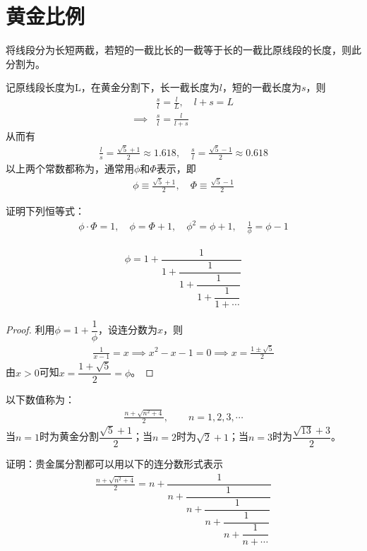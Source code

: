 
\section{黄金比例}
\label{sec:golden-ratio}

\begin{definition}
  将线段分为长短两截，若短的一截比长的一截等于长的一截比原线段的长度，则此分割为。
\end{definition}

记原线段长度为L，在黄金分割下，长一截长度为$l$，短的一截长度为$s$，则
\begin{align*}
  &\frac sl=\frac lL,\quad l+s=L\\
  \implies& \frac sl=\frac l{l+s}
\end{align*}
从而有
\begin{align*}
  \frac ls=\frac{\sqrt5+1}2\approx 1.618, \quad \frac sl=\frac{\sqrt5-1}2\approx 0.618
\end{align*}
以上两个常数都称为，通常用$\phi$和$\Phi$表示，即
\begin{align*}
  \phi\equiv\frac{\sqrt5+1}2,\quad \Phi\equiv\frac{\sqrt5-1}2
\end{align*}

\begin{question}
  证明下列恒等式：
  \begin{align*}
    \phi\cdot\Phi=1,\quad \phi=\Phi+1,\quad \phi^2=\phi+1,\quad \frac1\phi=\phi-1
  \end{align*}
\end{question}

\begin{example}[连分数表示]\label{ex:phi-of-continued-fraction}
  \begin{align}
    \phi = 1 + \dfrac1{1 + \dfrac1{1+\dfrac1{1+\dfrac1{1+\cdots}}}}
  \end{align}
\end{example}
\begin{proof}
  利用$\phi=1+\dfrac1\phi$，设连分数为$x$，则
  \begin{align*}
    \frac1{x-1}=x\implies x^2-x-1=0\implies x=\frac{1\pm\sqrt5}2
  \end{align*}
  由$x>0$可知$x=\dfrac{1+\sqrt5}2=\phi$。
\end{proof}

\begin{definition}
  以下数值称为：
  \begin{align}
    \frac{n+\sqrt{n^2+4}}2,\quad\quad n=1,2,3,\cdots
  \end{align}
  当$n=1$时为黄金分割$\dfrac{\sqrt5+1}2$；当$n=2$时为$\sqrt2+1$；当$n=3$时为$\dfrac{\sqrt{13}+3}2$。
\end{definition}
\begin{question}
  证明：贵金属分割都可以用以下的连分数形式表示
  \begin{align*}
    \frac{n+\sqrt{n^2+4}}2=
    n+\dfrac1{n+\dfrac1{n+\dfrac1{n+\dfrac1{n+\dfrac1{n+\cdots}}}}}
  \end{align*}
\end{question}

